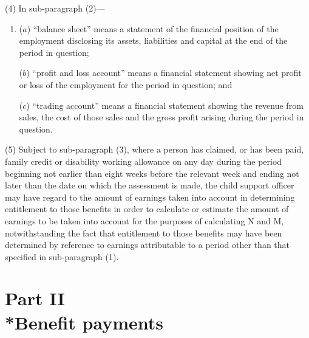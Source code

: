 \documentclass[12pt,a4paper]{article}
\begin{document}
(4) In sub-paragraph (2)—
\begin{enumerate}\item[]
($a$) “balance sheet” means a statement of the financial position of the employment disclosing its assets, liabilities and capital at the end of the period in question;

($b$) “profit and loss account” means a financial statement showing net profit or loss of the employment for the period in question; and

($c$) “trading account” means a financial statement showing the revenue from sales, the cost of those sales and the gross profit arising during the period in question.
\end{enumerate}

(5) Subject to sub-paragraph (3), where a person has claimed, or has been paid, family credit or disability working allowance on any day during the period beginning not earlier than eight weeks before the relevant week and ending not later than the date on which the assessment is made, the child support officer may have regard to the amount of earnings taken into account in determining entitlement to those benefits in order to calculate or estimate the amount of earnings to be taken into account for the purposes of calculating N and M, notwithstanding the fact that entitlement to those benefits may have been determined by reference to earnings attributable to a period other than that specified in sub-paragraph (1).


\section[Part II --- Benefit payments]{Part II\\*Benefit payments}
\end{document}
